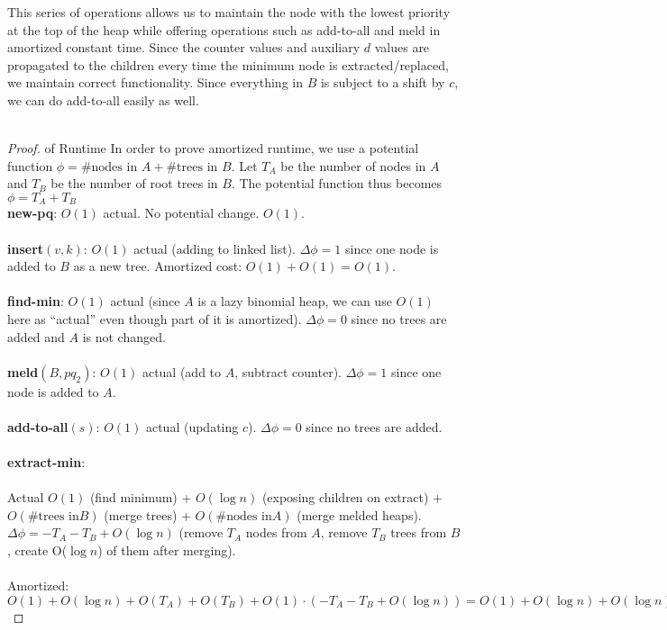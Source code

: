 \documentclass{article}
\theoremstyle{casestyle}
\begin{document}
This series of operations allows us to maintain the node with the lowest priority at the top of the heap while offering operations such as add-to-all and meld in amortized constant time. Since the counter values and auxiliary $d$ values are propagated to the children every time the minimum node is extracted/replaced, we maintain correct functionality. Since everything in $B$ is subject to a shift by $c$, we can do add-to-all easily as well. \\\\

\begin{proof} of Runtime
In order to prove amortized runtime, we use a potential function $\phi=\text{\# nodes in } A + \text{\# trees in } B$. Let $T_A$ be the number of nodes in $A$ and $T_B$ be the number of root trees in $B$. The potential function thus becomes $\phi=T_A+T_B$  \\
\textbf{new-pq}: $O(1)$ actual. No potential change. $O(1)$.\\\\
\textbf{insert}$(v,k)$: $O(1)$ actual (adding to linked list). $\Delta \phi = 1$ since one node is added to $B$ as a new tree. Amortized cost: $O(1) + O(1) = O(1)$.\\\\
\textbf{find-min}: $O(1)$ actual (since $A$ is a lazy binomial heap, we can use $O(1)$ here as ``actual'' even though part of it is amortized). $\Delta \phi = 0$ since no trees are added and $A$ is not changed.\\\\
\textbf{meld}$(B,pq_2)$: $O(1)$ actual (add to $A$, subtract counter). $\Delta \phi = 1$ since one node is added to $A$. \\\\
\textbf{add-to-all}$(s)$: $O(1)$ actual (updating $c$). $\Delta \phi = 0$ since no trees are added.\\\\
\textbf{extract-min}: \\\\ Actual $O(1)$ (find minimum) + $O(\log n)$ (exposing children on extract) + $O(\text{\# trees in} B)$ (merge trees) + $O(\text{\# nodes in} A)$ (merge melded heaps). $\Delta \phi = -T_A-T_B + O(\log n)$ (remove $T_A$ nodes from $A$, remove $T_B$ trees from $B$, create O($\log n$) of them after merging). \\\\ Amortized: $O(1) + O(\log n) + O(T_A) + O(T_B) + O(1) \cdot (-T_A - T_B + O(\log n)) = O(1) + O(\log n) + O(\log n) = O(\log n)$
\end{proof}
\end{document}
